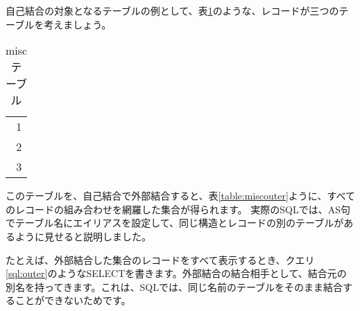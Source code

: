 自己結合の対象となるテーブルの例として、表\ref{table:misc}のような、レコードが三つのテーブルを考えましょう。


\begin{table}[htbp]
  \begin{tabular}{|r}} \hline
    num \\ \hline \hline  
    1 \\
    2 \\
    3 \\ \hline
  \end{tabular}
  \caption{miscテーブル}
  \label{table:misc}
\end{table}


このテーブルを、自己結合で外部結合すると、表\ref{table:miscouter}ように、すべてのレコードの組み合わせを網羅した集合が得られます。
実際のSQLでは、AS句でテーブル名にエイリアスを設定して、同じ構造とレコードの別のテーブルがあるように見せると説明しました。

たとえば、外部結合した集合のレコードをすべて表示するとき、クエリ\ref{sql:outer}のようなSELECTを書きます。外部結合の結合相手として、結合元の別名を持ってきます。これは、SQLでは、同じ名前のテーブルをそのまま結合することができないためです。

